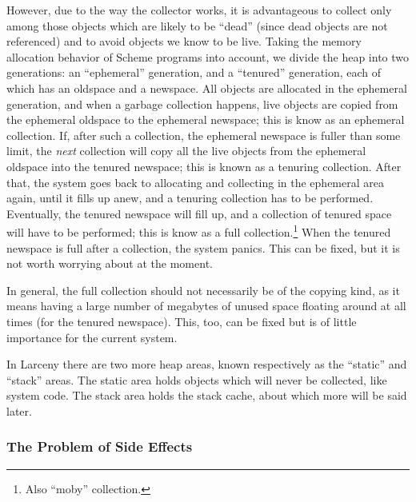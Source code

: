 However, due to the way the collector works, it is advantageous to
collect only among those objects which are likely to be ``dead''
(since dead objects are not referenced) and to avoid objects we know
to be live. Taking the memory allocation behavior of Scheme programs
into account, we divide the heap into two generations: an
``ephemeral'' generation, and a ``tenured'' generation, each of which
has an oldspace and a newspace. All objects are allocated in the
ephemeral generation, and when a garbage collection happens, live
objects are copied from the ephemeral oldspace to the ephemeral
newspace; this is know as an ephemeral collection. If, after such a
collection, the ephemeral newspace is fuller than some limit, the {\em
next} collection will copy all the live objects from the ephemeral
oldspace into the tenured newspace; this is known as a tenuring
collection. After that, the system goes back to allocating and
collecting in the ephemeral area again, until it fills up anew, and a
tenuring collection has to be performed.  Eventually, the tenured
newspace will fill up, and a collection of tenured space will have to
be performed; this is know as a full collection.\footnote{Also ``moby''
collection.} When the tenured newspace is full after a collection,
the system panics. This can be fixed, but it is not worth 
worrying about at the moment.

In general, the full collection should not necessarily be of the copying
kind, as it means having a large number of megabytes of unused space
floating around at all times (for the tenured newspace). This, too, can be
fixed but is of little importance for the current system.

In Larceny there are two more heap areas, known respectively as the
``static'' and ``stack'' areas. The static area holds objects which
will never be collected, like system code. The stack area holds the
stack cache, about which more will be said later.

\subsubsection{The Problem of Side Effects}

